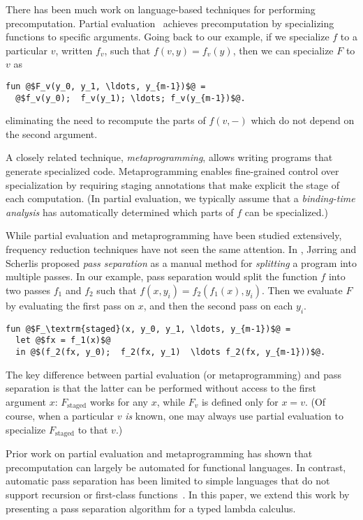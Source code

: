 There has been much work on language-based techniques for performing
precomputation. Partial evaluation~\cite{futamura71,jones96} achieves
precomputation by specializing functions to specific arguments. Going back to
our example, if we specialize $f$ to a particular $v$, written $f_v$, such that
$f(v,y) = f_v(y)$, then we can specialize $F$ to $v$ as
\begin{lstlisting}
fun @$F_v(y_0, y_1, \ldots, y_{m-1})$@ = 
  @$f_v(y_0);  f_v(y_1); \ldots; f_v(y_{m-1})$@.
\end{lstlisting}
eliminating the need to recompute the parts of $f(v,-)$ which do not depend on
the second argument.

A closely related technique, {\em metaprogramming}, allows writing programs that
generate specialized code. Metaprogramming enables fine-grained control over
specialization by requiring staging annotations that make explicit the stage of
each computation. (In partial evaluation, we typically assume that a
\emph{binding-time analysis} has automatically determined which parts of $f$ can
be specialized.)

While partial evaluation and metaprogramming have been studied extensively,
frequency reduction techniques have not seen the same attention. In
\cite{JS86-staging}, J{\o}rring and Scherlis proposed {\em pass separation} as a
manual method for {\em splitting} a program into multiple passes.
%
In our example, pass separation would split the function $f$ into two passes
$f_1$ and $f_2$ such that $f(x,y_i) = f_2(f_1(x),y_i)$. Then we evaluate $F$ by
evaluating the first pass on $x$, and then the second pass on each $y_i$.
%
\begin{lstlisting}
fun @$F_\textrm{staged}(x, y_0, y_1, \ldots, y_{m-1})$@ = 
  let @$fx = f_1(x)$@
  in @$(f_2(fx, y_0);  f_2(fx, y_1)  \ldots f_2(fx, y_{m-1}))$@.
\end{lstlisting}
%
The key difference between partial evaluation (or metaprogramming) and pass
separation is that the latter can be performed without access to the first
argument $x$: $F_\textrm{staged}$ works for any $x$, while $F_v$ is defined
only for $x=v$. (Of course, when a particular $v$ \emph{is} known, one may
always use partial evaluation to specialize $F_\textrm{staged}$ to that $v$.)

Prior work on partial evaluation and metaprogramming has shown that
precomputation can largely be automated for functional languages. In contrast,
automatic pass separation has been limited to simple languages that do not
support recursion or first-class
functions~\cite{knoblock96,Proudfoot:2001,Foley:2011,He:2014}. In this paper, we
extend this work by presenting a pass separation algorithm for a typed lambda
calculus.

